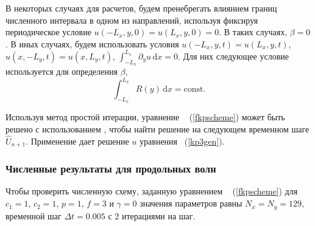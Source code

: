В некоторых случаях для расчетов, будем пренебрегать влиянием границ численного интервала в одном из направлений, используя фиксируя периодическое условие $u (-L_x, y, 0) = u (L_x, y, 0) = 0$. В таких случаях, $\beta = 0$. В иных случаях, будем использовать условия $ u (-L_x, y, t) = u (L_x, y, t) $, $ u (x, -L_y, t) = u (x, L_y, t) $, $\int_{-L_x}^{L_x} \partial_y u \,\mathrm{d}x = 0$. Для них следующее условие используется для определения $ \beta $,
\begin{equation}
	\label{condperidoic}
	\int_{-L_x}^{L_x} R(y)\, \mathrm{d}x = \text{const}. 
\end{equation}

Используя метод простой итерации, уравнение ~ (\ref{fkpscheme}) может быть решено с использованием , чтобы найти решение на следующем временном шаге $ \hat {U}_{n + 1} $. Применение  дает решение $ u $ уравнения ~(\ref{kp3gen}).

\subsubsection{Численные результаты для продольных волн}

Чтобы проверить численную схему, заданную уравнением ~ (\ref {fkpscheme}) для $c_1 = 1$, $c_2 = 1$, $p = 1$, $f = 3$ и $\gamma = 0$ значения параметров равны $N_x = N_y = 129$, временной шаг $\Delta t = 0.005$ с 2 итерациями на шаг.

